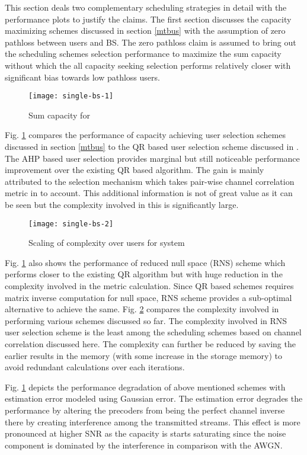 
This section deals two complementary scheduling strategies in detail with the performance plots to justify the claims. The first section discusses the capacity maximizing schemes discussed in section \ref{mtbus} with the assumption of zero pathloss between users and BS. The zero pathloss claim is assumed to bring out the scheduling schemes selection performance to maximize the sum capacity without which the all capacity seeking selection performs relatively closer with significant bias towards low pathloss users.
\begin{figure}
\centering
\texttt{[image: single-bs-1]}
\caption[short]{Sum capacity for }
\label{single-bs-f1}
\end{figure}

Fig. \ref{single-bs-f1} compares the performance of capacity achieving user selection schemes discussed in section \ref{mtbus} to the QR based user selection scheme discussed in \cite{antti_user_selection,jin2010novel}. The AHP based user selection provides marginal but still noticeable performance improvement over the existing QR based algorithm. The gain is mainly attributed to the selection mechanism which takes pair-wise channel correlation metric in to account. This additional information is not of great value as it can be seen but the complexity involved in this is significantly large.
\begin{figure}
\centering
\texttt{[image: single-bs-2]}
\caption[short]{Scaling of complexity over users for  system}
\label{single-bs-f2}
\end{figure}

Fig. \ref{single-bs-f1} also shows the performance of reduced null space (RNS) scheme which performs closer to the existing QR algorithm but with huge reduction in the complexity involved in the metric calculation. Since QR based schemes requires matrix inverse computation for null space, RNS scheme provides a sub-optimal alternative to achieve the same. Fig. \ref{single-bs-f2} compares the complexity involved in performing various schemes discussed so far. The complexity involved in RNS user selection scheme is the least among the scheduling schemes based on channel correlation discussed here. The complexity can further be reduced by saving the earlier results in the memory (with some increase in the storage memory) to avoid redundant calculations over each iterations.

Fig. \ref{single-bs-f1} depicts the performance degradation of above mentioned schemes with  estimation error modeled using Gaussian error. The estimation error degrades the performance by altering the precoders from being the perfect channel inverse there by creating interference among the transmitted streams. This effect is more pronounced at higher SNR as the capacity is starts saturating since the noise component is dominated by the interference in comparison with the AWGN.
